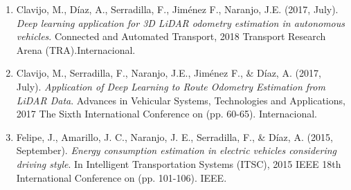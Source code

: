 \begin{enumerate}
	\item Clavijo, M., Díaz, A., Serradilla, F., Jiménez F., Naranjo, J.E. (2017, July). \textit{Deep learning application for 3D LiDAR odometry estimation in autonomous vehicles}. Connected and Automated Transport, 2018 Transport Research Arena (TRA).Internacional.
	\item Clavijo, M., Serradilla, F., Naranjo, J.E., Jiménez F., \& Díaz, A. (2017, July). \textit{Application of Deep Learning to Route Odometry Estimation from LiDAR Data}. Advances in Vehicular Systems, Technologies and Applications, 2017 The Sixth International Conference on (pp. 60-65). Internacional.
	\item Felipe, J., Amarillo, J. C., Naranjo, J. E., Serradilla, F., \& Díaz, A. (2015, September). \textit{Energy consumption estimation in electric vehicles considering driving style}. In Intelligent Transportation Systems (ITSC), 2015 IEEE 18th International Conference on (pp. 101-106). IEEE.
\end{enumerate}